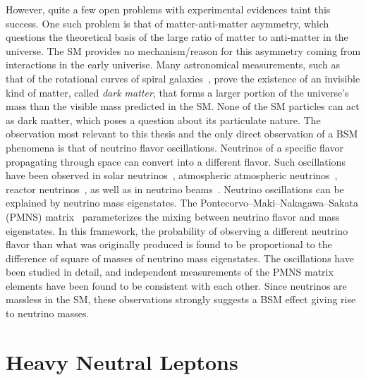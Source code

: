 However, quite a few open problems with experimental evidences taint this success. One such problem is that of matter-anti-matter asymmetry, which questions the theoretical basis of the large ratio of matter to anti-matter in the universe. The SM provides no mechanism/reason for this asymmetry coming from interactions in the early univerise. Many astronomical measurements, such as that of the rotational curves of spiral galaxies~\cite{Begeman:1989kf}, prove the existence of an invisible kind of matter, called \textit{dark matter}, that forms a larger portion of the universe's mass than the visible mass predicted in the SM. None of the SM particles can act as dark matter, which poses a question about its particulate nature. The observation most relevant to this thesis and the only direct observation of a BSM phenomena is that of neutrino flavor oscillations. Neutrinos of a specific flavor propagating through space can convert into a different flavor. Such oscillations have been observed in solar neutrinos~\cite{PhysRevLett.87.071301}, atmospheric atmospheric neutrinos~\cite{PhysRevLett.81.1562}, reactor neutrinos~\cite{PhysRevLett.108.171803}, as well as in neutrino beams~\cite{PhysRevD.88.032002}. Neutrino oscillations can be explained by neutrino mass eigenstates. The Pontecorvo–Maki–Nakagawa–Sakata (PMNS) matrix~\cite{Maki1962} parameterizes the mixing between neutrino flavor and mass eigenstates. In this framework, the probability of observing a different neutrino flavor than what was originally produced is found to be proportional to the difference of square of masses of neutrino mass eigenstates. The oscillations have been studied in detail, and independent measurements of the PMNS matrix elements have been found to be consistent with each other. Since neutrinos are massless in the SM, these observations strongly suggests a BSM effect giving rise to neutrino masses.

\section{Heavy Neutral Leptons}\label{sec:hnl}

